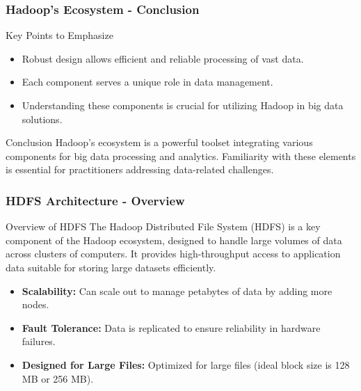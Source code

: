 \documentclass[aspectratio=169]{beamer}
\begin{document}
\begin{frame}[fragile]
    \frametitle{Hadoop's Ecosystem - Conclusion}
    \begin{block}{Key Points to Emphasize}
        \begin{itemize}
            \item Robust design allows efficient and reliable processing of vast data.
            \item Each component serves a unique role in data management.
            \item Understanding these components is crucial for utilizing Hadoop in big data solutions.
        \end{itemize}
    \end{block}
    \begin{block}{Conclusion}
        Hadoop's ecosystem is a powerful toolset integrating various components for big data processing and analytics. Familiarity with these elements is essential for practitioners addressing data-related challenges.
    \end{block}
\end{frame}

\begin{frame}[fragile]
    \frametitle{HDFS Architecture - Overview}
    \begin{block}{Overview of HDFS}
        The Hadoop Distributed File System (HDFS) is a key component of the Hadoop ecosystem, designed to handle large volumes of data across clusters of computers. It provides high-throughput access to application data suitable for storing large datasets efficiently.
    \end{block}
    
    \begin{itemize}
        \item \textbf{Scalability:} Can scale out to manage petabytes of data by adding more nodes.
        \item \textbf{Fault Tolerance:} Data is replicated to ensure reliability in hardware failures.
        \item \textbf{Designed for Large Files:} Optimized for large files (ideal block size is 128 MB or 256 MB).
    \end{itemize}
\end{frame}
\end{document}
